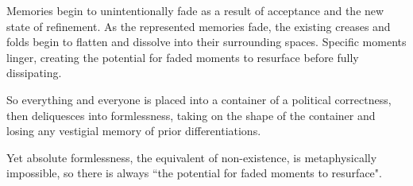 \begin{quotex}
Memories begin to unintentionally fade as a result of acceptance and the new state of refinement. As the represented memories fade, the existing creases and folds begin to flatten and dissolve into their surrounding spaces. Specific moments linger, creating the potential for faded moments to resurface before fully dissipating. 

\end{quotex}
So everything and everyone is placed into a container of a political correctness, then deliquesces into formlessness, taking on the shape of the container and losing any vestigial memory of prior differentiations.

Yet absolute formlessness, the equivalent of non-existence, is metaphysically impossible, so there is always ``the potential for faded moments to resurface".



